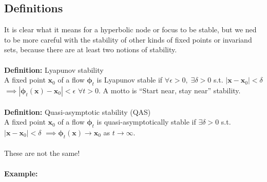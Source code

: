 \documentclass{article}
\newcommand{\bp}{\bm{\phi}}   %
\begin{document}
\subsection{Definitions}
It is clear what it means for a hyperbolic node or focus to be stable, but we
ned to be more careful with the stability of other kinds of fixed points or 
invariand sets, because there are at least two notions of stability.
\\
\\
\textbf{Definition:} Lyapunov stability
\\
A fixed point $\bm{x}_0$ of a flow $\bp_t$ is Lyapunov stable if
$\forall \epsilon > 0, \; \exists \delta > 0$ s.t. $|\bm{x}-\bm{x}_0| < \delta$
$\implies |\bp_t(\bm{x}) - \bm{x}_0| < \epsilon$ $\forall t>0$.
A motto is ``Start near, stay near'' stability.
\\
\\
\textbf{Definition:} Quasi-asymptotic stability (QAS)
\\
A fixed point $\bm{x}_0$ of a flow $\bp_t$ is quasi-asymptotically 
stable if $\exists \delta > 0$ s.t. $|\bm{x}-\bm{x}_0| < \delta$ $\implies
\bp_t(\bm{x}) \to \bm{x}_0$ as $t \to \infty$.
\\
\\
These are not the same!
\\
\\
\textbf{Example:}
\\
\end{document}
